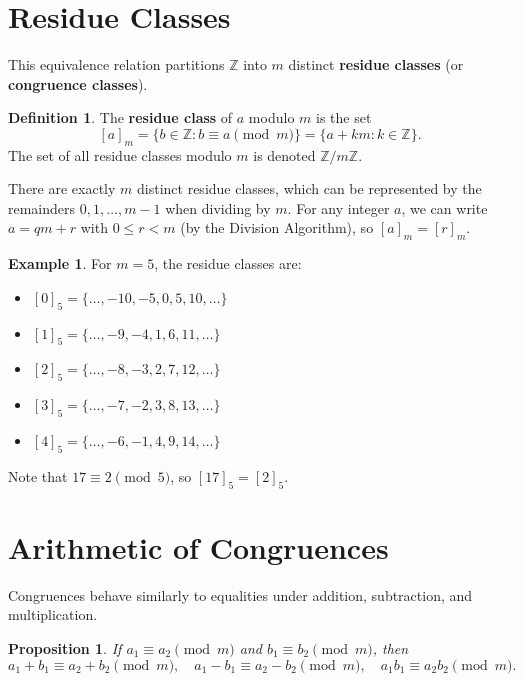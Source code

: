 \documentclass[12pt,openany]{book}
\theoremstyle{definition}
\newtheorem{definition}{Definition}[chapter]
\newtheorem{example}{Example}[chapter]
\theoremstyle{plain}
\newtheorem{proposition}{Proposition}[chapter]
\theoremstyle{remark}
\begin{document}
\section{Residue Classes}
This equivalence relation partitions $\mathbb{Z}$ into $m$ distinct \textbf{residue classes} (or \textbf{congruence classes}).

\begin{definition}
  The \textbf{residue class} of $a$ modulo $m$ is the set
  \[
    [a]_m = \{ b \in \mathbb{Z} : b \equiv a \pmod{m} \} = \{ a + k m : k \in \mathbb{Z} \}.
  \]
  The set of all residue classes modulo $m$ is denoted $\mathbb{Z}/m\mathbb{Z}$.
\end{definition}
\noindent
There are exactly $m$ distinct residue classes, which can be represented by the remainders $0, 1, \dots, m-1$ when dividing by $m$. For any integer $a$, we can write $a = q m + r$ with $0 \leq r < m$ (by the Division Algorithm), so $[a]_m = [r]_m$.

\begin{example}
  For $m=5$, the residue classes are:
  \begin{itemize}
    \item $[0]_5 = \{\dots, -10, -5, 0, 5, 10, \dots\}$
    \item $[1]_5 = \{\dots, -9, -4, 1, 6, 11, \dots\}$
    \item $[2]_5 = \{\dots, -8, -3, 2, 7, 12, \dots\}$
    \item $[3]_5 = \{\dots, -7, -2, 3, 8, 13, \dots\}$
    \item $[4]_5 = \{\dots, -6, -1, 4, 9, 14, \dots\}$
  \end{itemize}
  Note that $17 \equiv 2 \pmod{5}$, so $[17]_5 = [2]_5$.
\end{example}

\section{Arithmetic of Congruences}

Congruences behave similarly to equalities under addition, subtraction, and multiplication.

\begin{proposition}
  If $a_1 \equiv a_2 \pmod{m}$ and $b_1 \equiv b_2 \pmod{m}$, then
  \[
    a_1 + b_1 \equiv a_2 + b_2 \pmod{m}, \quad a_1 - b_1 \equiv a_2 - b_2 \pmod{m}, \quad a_1 b_1 \equiv a_2 b_2 \pmod{m}.
  \]
\end{proposition}
\end{document}
